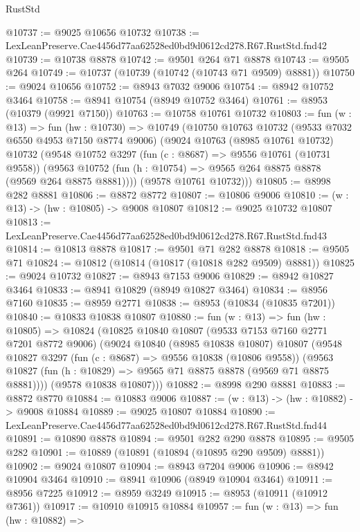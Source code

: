 \begin{lexlean}{RustStd}
\begin{coremodule}
@10737 := @9025 @10656 @10732
@10738 := LexLeanPreserve.Cae4456d77aa62528ed0bd9d0612cd278.R67.RustStd.fnd42
@10739 := @10738 @8878
@10742 := @9501 @264 @71 @8878
@10743 := @9505 @264
@10749 := @10737 (@10739 (@10742 (@10743 @71 @9509) @8881))
@10750 := @9024 @10656
@10752 := @8943 @7032 @9006
@10754 := @8942 @10752 @3464
@10758 := @8941 @10754 (@8949 @10752 @3464)
@10761 := @8953 (@10379 (@9921 @7150))
@10763 := @10758 @10761 @10732
@10803 := fun (w : @13) =>
  fun (hw : @10730) =>
  @10749
    (@10750
      @10763
      @10732
      (@9533 @7032 @6550 @4953 @7150 @8774 @9006)
      (@9024
        @10763
        (@8985 @10761 @10732)
        @10732
        (@9548
          @10752
          @3297
          (fun (c : @8687) => @9556 @10761 (@10731 @9558))
          (@9563 @10752 (fun (h : @10754) => @9565 @264 @8875 @8878 (@9569 @264 @8875 @8881))))
        (@9578 @10761 @10732)))
@10805 := @8998 @282 @8881
@10806 := @8872 @8772
@10807 := @10806 @9006
@10810 := (w : @13) -> (hw : @10805) -> @9008 @10807
@10812 := @9025 @10732 @10807
@10813 := LexLeanPreserve.Cae4456d77aa62528ed0bd9d0612cd278.R67.RustStd.fnd43
@10814 := @10813 @8878
@10817 := @9501 @71 @282 @8878
@10818 := @9505 @71
@10824 := @10812 (@10814 (@10817 (@10818 @282 @9509) @8881))
@10825 := @9024 @10732
@10827 := @8943 @7153 @9006
@10829 := @8942 @10827 @3464
@10833 := @8941 @10829 (@8949 @10827 @3464)
@10834 := @8956 @7160
@10835 := @8959 @2771
@10838 := @8953 (@10834 (@10835 @7201))
@10840 := @10833 @10838 @10807
@10880 := fun (w : @13) =>
  fun (hw : @10805) =>
  @10824
    (@10825
      @10840
      @10807
      (@9533 @7153 @7160 @2771 @7201 @8772 @9006)
      (@9024
        @10840
        (@8985 @10838 @10807)
        @10807
        (@9548
          @10827
          @3297
          (fun (c : @8687) => @9556 @10838 (@10806 @9558))
          (@9563 @10827 (fun (h : @10829) => @9565 @71 @8875 @8878 (@9569 @71 @8875 @8881))))
        (@9578 @10838 @10807)))
@10882 := @8998 @290 @8881
@10883 := @8872 @8770
@10884 := @10883 @9006
@10887 := (w : @13) -> (hw : @10882) -> @9008 @10884
@10889 := @9025 @10807 @10884
@10890 := LexLeanPreserve.Cae4456d77aa62528ed0bd9d0612cd278.R67.RustStd.fnd44
@10891 := @10890 @8878
@10894 := @9501 @282 @290 @8878
@10895 := @9505 @282
@10901 := @10889 (@10891 (@10894 (@10895 @290 @9509) @8881))
@10902 := @9024 @10807
@10904 := @8943 @7204 @9006
@10906 := @8942 @10904 @3464
@10910 := @8941 @10906 (@8949 @10904 @3464)
@10911 := @8956 @7225
@10912 := @8959 @3249
@10915 := @8953 (@10911 (@10912 @7361))
@10917 := @10910 @10915 @10884
@10957 := fun (w : @13) =>
  fun (hw : @10882) =>

\end{coremodule}
\end{lexlean}
